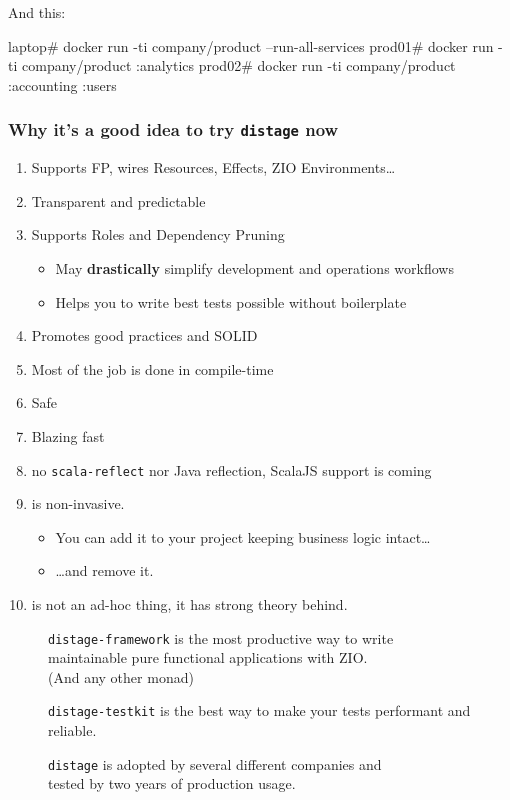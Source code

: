 \documentclass[usenames,dvipsnames,aspectratio=169]{beamer}
\newcommand{\distage}{\texttt{distage}\xspace}
\begin{document}
\begin{frame}[fragile]
And this:

\begin{textcode}
laptop# docker run -ti company/product --run-all-services
prod01# docker run -ti company/product :analytics
prod02# docker run -ti company/product :accounting :users
\end{textcode}
\end{frame}

\begin{frame}
  \frametitle{Why it's a good idea to try \distage now}
  \begin{enumerate}
    \item Supports FP, wires Resources, Effects, ZIO Environments\dots
    \item Transparent and predictable
    \item Supports Roles and Dependency Pruning
      \begin{itemize}
        \item May \textbf{drastically} simplify development and operations workflows
        \item Helps you to write best tests possible without boilerplate
      \end{itemize}
    \item Promotes good practices and SOLID
    \item Most of the job is done in compile-time
    \item Safe
    \item Blazing fast
    \item no \texttt{scala-reflect} nor Java reflection, ScalaJS support is coming
    \item is non-invasive.
      \begin{itemize}
        \item You can add it to your project keeping business logic intact\dots
        \item \dots and remove it.
      \end{itemize}
    \item is not an ad-hoc thing, it has strong theory behind.
  \end{enumerate}
\end{frame}

\begin{frame}
  \begin{figure}
    \texttt{distage-framework} is the most productive way to write \\
    maintainable pure functional applications with ZIO. \\
    (And any other monad)
  \end{figure}
  \begin{figure}
    \texttt{distage-testkit} is the best way to make your tests performant and reliable.
  \end{figure}
  \begin{figure}
    \distage is adopted by several different companies and \\
    tested by two years of production usage.
  \end{figure}
\end{frame}
\end{document}
